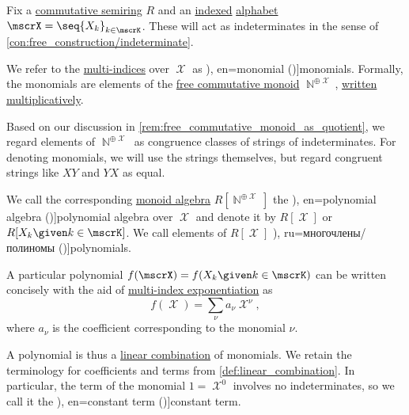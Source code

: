 \begin{definition}\label{def:polynomial_algebra}\mimprovised
  Fix a \hyperref[def:semiring/commutative]{commutative semiring} \( R \) and an \hyperref[def:indexed_family]{indexed} \hyperref[def:formal_language/alphabet]{alphabet}  \( \mscrX = \seq{ X_k }_{k \in \mscrK} \). These will act as indeterminates in the sense of \cref{con:free_construction/indeterminate}.

  \begin{thmenum}
     We refer to the \hyperref[def:multi_index]{multi-indices} over \( \mscrX \) as \term[ru=одночлены/мономы (\cite[\S 11.3]{Тыртышников2007ЛинейнаяАлгебра}), en=monomial (\cite[2]{Bourbaki2003Algebra4to7})]{monomials}. Formally, the monomials are elements of the \hyperref[def:free_commutative_monoid]{free commutative monoid} \( \BbbN^{\oplus \mscrX} \), \hyperref[def:additive_semigroup]{written multiplicatively}.

    Based on our discussion in \cref{rem:free_commutative_monoid_as_quotient}, we regard elements of \( \BbbN^{\oplus \mscrX} \) as congruence classes of strings of indeterminates. For denoting monomials, we will use the strings themselves, but regard congruent strings like \( XY \) and \( YX \) as equal.

     We call the corresponding \hyperref[def:semigroup_algebra]{monoid algebra} \( R[\BbbN^{\oplus \mscrX}] \) the \term[ru=алгебра многочленов (\cite[92]{Винберг2014КурсАлгебры}), en=polynomial algebra (\cite[473]{Bourbaki1998Algebra1to3})]{polynomial algebra} over \( \mscrX \) and denote it by \( R[\mscrX] \) or \( R[X_k \given k \in \mscrK] \). We call elements of \( R[\mscrX] \) \term[bg=полиноми (\cite[1]{Обрешков1962ВисшаАлгебра}), ru=многочлены/полиномы (\cite[\S 11.3]{Тыртышников2007ЛинейнаяАлгебра})]{polynomials}.

    A particular polynomial \( f(\mscrX) = f(X_k \given k \in \mscrK) \) can be written concisely with the aid of \hyperref[def:multi_index/power]{multi-index exponentiation} as
    \begin{equation}\label{eq:def:polynomial_algebra/polynomials}
      f(\mscrX) = \sum_\nu a_\nu \mscrX^\nu,
    \end{equation}
    where \( a_\nu \) is the coefficient corresponding to the monomial \( \nu \).

    A polynomial is thus a \hyperref[def:linear_combination]{linear combination} of monomials. We retain the terminology for coefficients and terms from \cref{def:linear_combination}. In particular, the term of the monomial \( 1 = \mscrX^0 \) involves no indeterminates, so we call it the \term[ru=свободный член (\cite[118]{Тыртышников2007ЛинейнаяАлгебра}), en=constant term (\cite[1]{Bourbaki2003Algebra4to7})]{constant term}.


\end{thmenum}
\end{definition}
